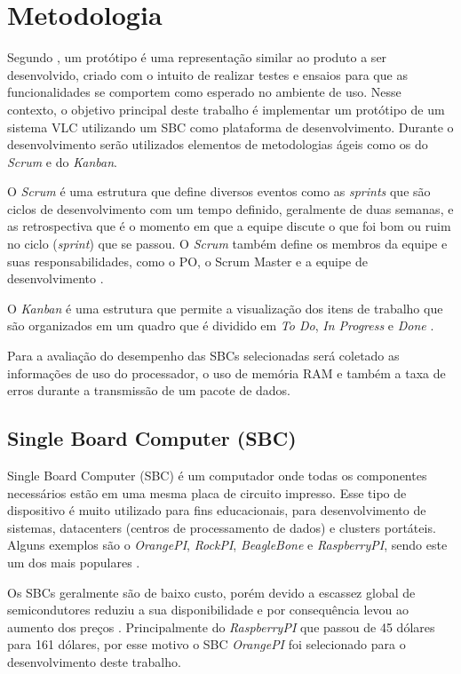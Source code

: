 \chapter{Metodologia}

Segundo , um protótipo é uma representação similar ao produto a ser desenvolvido, criado com o intuito de realizar testes e ensaios para que as funcionalidades se comportem como esperado no ambiente de uso. Nesse contexto, o objetivo principal deste trabalho é implementar um protótipo de um sistema VLC utilizando um SBC como plataforma de desenvolvimento. Durante o desenvolvimento serão utilizados elementos de metodologias ágeis como os do \textit{Scrum} e do \textit{Kanban}.

O \textit{Scrum} é uma estrutura que define diversos eventos como as \textit{sprints} que são ciclos de desenvolvimento com um tempo definido, geralmente de duas semanas, e as retrospectiva que é o momento em que a equipe discute o que foi bom ou ruim no ciclo (\textit{sprint}) que se passou. O \textit{Scrum} também define os membros da equipe e suas responsabilidades, como o PO, o Scrum Master e a equipe de desenvolvimento \cite{scrum}. 

O \textit{Kanban} é uma estrutura que permite a visualização dos itens de trabalho que são organizados em um quadro que é dividido em \textit{To Do}, \textit{In Progress} e \textit{Done} \cite{kanbam}.

Para a avaliação do desempenho das SBCs selecionadas será coletado as informações de uso do processador, o uso de memória RAM e também a taxa de erros durante a transmissão de um pacote de dados.

\section{Single Board Computer (SBC)}

Single Board Computer (SBC) é um computador onde todas os componentes necessários estão em uma mesma placa de circuito impresso. Esse tipo de dispositivo é muito utilizado para fins educacionais, para desenvolvimento de sistemas, datacenters (centros  de  processamento  de  dados) e clusters portáteis. Alguns exemplos são o \textit{OrangePI}, \textit{RockPI}, \textit{BeagleBone} e \textit{RaspberryPI}, sendo este um dos mais populares \cite{SBC_edu}.

Os SBCs geralmente são de baixo custo, porém devido a escassez global de semicondutores reduziu a sua disponibilidade e por consequência levou ao aumento dos preços \cite{zeng_2022}. Principalmente do \textit{RaspberryPI} que passou de 45 dólares para 161 dólares, por esse motivo o SBC \textit{OrangePI} foi selecionado para o desenvolvimento deste trabalho.

